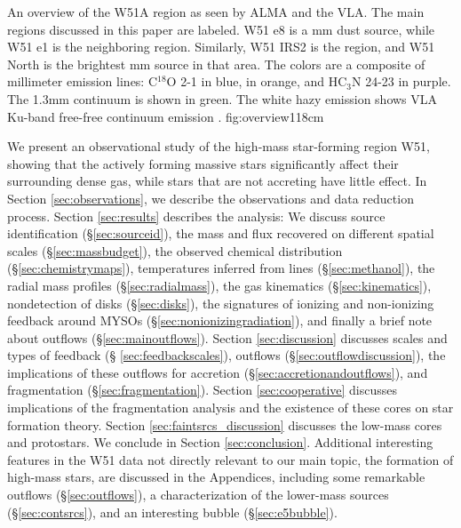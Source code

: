 \documentclass{emulateapj}
\begin{document}
{An overview of the W51A region as seen by ALMA and the VLA.  The main regions
discussed in this paper are labeled.  W51 e8 is a mm dust source, while W51 e1
is the neighboring \hii region.  Similarly, W51 IRS2 is the \hii region, and
W51 North is the brightest mm source in that area.  The colors are a composite
of millimeter emission lines: C$^{18}$O 2-1 in blue, \methanol \fourtwotwo in
orange, and HC$_3$N 24-23 in
purple.  The 1.3mm continuum is shown in green.  The white hazy emission
shows VLA Ku-band free-free continuum emission
\citep{Ginsburg2016b}.}
{fig:overview}{1}{18cm}


We present an observational study of the high-mass star-forming region W51,
showing that the actively forming massive stars significantly affect their
surrounding dense gas, while stars that are not accreting have little effect.
 In Section
\ref{sec:observations}, we describe the observations and data reduction
process.  Section \ref{sec:results} describes the analysis:
We discuss source identification (\S \ref{sec:sourceid}),
the mass and flux recovered on different
spatial scales (\S \ref{sec:massbudget}),
the observed chemical distribution (\S \ref{sec:chemistrymaps}), 
temperatures inferred from \methanol lines (\S \ref{sec:methanol}),
the radial mass profiles (\S \ref{sec:radialmass}), the gas kinematics
(\S \ref{sec:kinematics}), nondetection of disks (\S \ref{sec:disks}),
the signatures of ionizing and non-ionizing feedback around MYSOs
(\S \ref{sec:nonionizingradiation}), and finally a brief note about outflows
(\S \ref{sec:mainoutflows}).
Section \ref{sec:discussion} discusses scales and types of feedback (\S
\ref{sec:feedbackscales}), outflows (\S \ref{sec:outflowdiscussion}),
the implications of these outflows for accretion (\S \ref{sec:accretionandoutflows}),
and fragmentation (\S \ref{sec:fragmentation}).  
Section \ref{sec:cooperative} discusses implications
of the fragmentation analysis and the existence of these cores on star
formation theory.  Section \ref{sec:faintsrcs_discussion} discusses the
low-mass cores and protostars.
We conclude in Section \ref{sec:conclusion}.
Additional interesting features in the W51 data not directly relevant
to our main topic, the formation of high-mass stars,
are discussed in the Appendices, including
some remarkable outflows 
(\S \ref{sec:outflows}),  a characterization of the lower-mass sources
(\S \ref{sec:contsrcs}),
and an interesting bubble (\S \ref{sec:e5bubble}).
\end{document}
